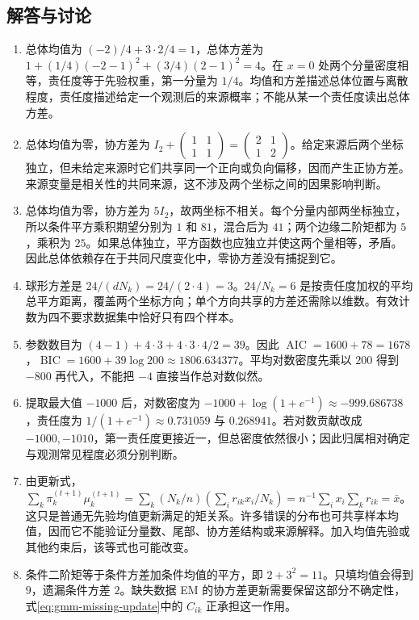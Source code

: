 \documentclass[UTF8]{ctexart}
\begin{document}
\subsection{解答与讨论}
\begin{enumerate}
\item 总体均值为 $(-2)/4+3\cdot2/4=1$，总体方差为 $1+(1/4)(-2-1)^2+(3/4)(2-1)^2=4$。在 $x=0$ 处两个分量密度相等，责任度等于先验权重，第一分量为 $1/4$。均值和方差描述总体位置与离散程度，责任度描述给定一个观测后的来源概率；不能从某一个责任度读出总体方差。
\item 总体均值为零，协方差为 $I_2+\begin{pmatrix}1&1\\1&1\end{pmatrix}=\begin{pmatrix}2&1\\1&2\end{pmatrix}$。给定来源后两个坐标独立，但未给定来源时它们共享同一个正向或负向偏移，因而产生正协方差。来源变量是相关性的共同来源，这不涉及两个坐标之间的因果影响判断。
\item 总体均值为零，协方差为 $5I_2$，故两坐标不相关。每个分量内部两坐标独立，所以条件平方乘积期望分别为 $1$ 和 $81$，混合后为 $41$；两个边缘二阶矩都为 $5$，乘积为 $25$。如果总体独立，平方函数也应独立并使这两个量相等，矛盾。因此总体依赖存在于共同尺度变化中，零协方差没有捕捉到它。
\item 球形方差是 $24/(dN_k)=24/(2\cdot4)=3$。$24/N_k=6$ 是按责任度加权的平均总平方距离，覆盖两个坐标方向；单个方向共享的方差还需除以维数。有效计数为四不要求数据集中恰好只有四个样本。
\item 参数数目为 $(4-1)+4\cdot3+4\cdot3\cdot4/2=39$。因此 $\operatorname{AIC}=1600+78=1678$，$\operatorname{BIC}=1600+39\log200\approx1806.634377$。平均对数密度先乘以 $200$ 得到 $-800$ 再代入，不能把 $-4$ 直接当作总对数似然。
\item 提取最大值 $-1000$ 后，对数密度为 $-1000+\log(1+e^{-1})\approx-999.686738$，责任度为 $1/(1+e^{-1})\approx0.731059$ 与 $0.268941$。若对数贡献改成 $-1000,-1010$，第一责任度更接近一，但总密度依然很小；因此归属相对确定与观测常见程度必须分别判断。
\item 由更新式，$\sum_k\pi_k^{(t+1)}\mu_k^{(t+1)}=\sum_k(N_k/n)(\sum_i r_{ik}x_i/N_k)=n^{-1}\sum_i x_i\sum_kr_{ik}=\bar x$。这只是普通无先验均值更新满足的矩关系。许多错误的分布也可共享样本均值，因而它不能验证分量数、尾部、协方差结构或来源解释。加入均值先验或其他约束后，该等式也可能改变。
\item 条件二阶矩等于条件方差加条件均值的平方，即 $2+3^2=11$。只填均值会得到 $9$，遗漏条件方差 $2$。缺失数据 EM 的协方差更新需要保留这部分不确定性，式\eqref{eq:gmm-missing-update}中的 $C_{ik}$ 正承担这一作用。
\end{enumerate}
\end{document}
